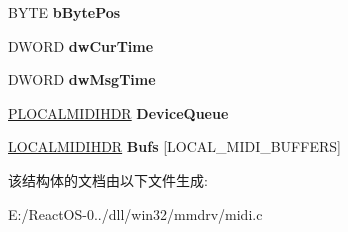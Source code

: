 \begin{DoxyCompactItemize}
B\+Y\+TE {\bfseries b\+Byte\+Pos}
\item 
\mbox{\label{struct_l_o_c_a_l_m_i_d_i_d_a_t_a_ad8e21bddbbec3898481a5a4a8c63d416}} 
D\+W\+O\+RD {\bfseries dw\+Cur\+Time}
\item 
\mbox{\label{struct_l_o_c_a_l_m_i_d_i_d_a_t_a_ac27f5f59618e413fbc95e2ce71bffea8}} 
D\+W\+O\+RD {\bfseries dw\+Msg\+Time}
\item 
\mbox{\label{struct_l_o_c_a_l_m_i_d_i_d_a_t_a_a262fac3b433335d00029072a80723a9c}} 
\hyperlink{struct___l_o_c_a_l_m_i_d_i_h_d_r}{P\+L\+O\+C\+A\+L\+M\+I\+D\+I\+H\+DR} {\bfseries Device\+Queue}
\item 
\mbox{\label{struct_l_o_c_a_l_m_i_d_i_d_a_t_a_ae1ccd65da3b183d14bc05c9208eda8e0}} 
\hyperlink{struct___l_o_c_a_l_m_i_d_i_h_d_r}{L\+O\+C\+A\+L\+M\+I\+D\+I\+H\+DR} {\bfseries Bufs} \mbox{[}L\+O\+C\+A\+L\+\_\+\+M\+I\+D\+I\+\_\+\+B\+U\+F\+F\+E\+RS\mbox{]}
\end{DoxyCompactItemize}


该结构体的文档由以下文件生成\+:\begin{DoxyCompactItemize}
\item 
E\+:/\+React\+O\+S-\/0../dll/win32/mmdrv/midi.\+c\end{DoxyCompactItemize}

